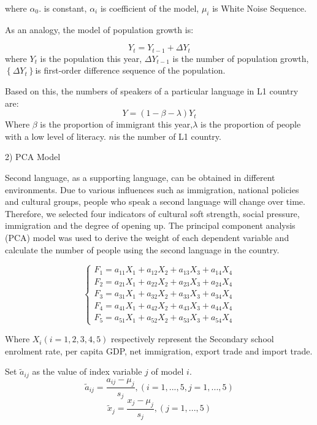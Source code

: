 where ${{\alpha }_{0}}$. is constant, ${{\alpha }_{i}}$ is coefficient of the model, ${{\mu }_{i}}$ is White Noise Sequence.

As an analogy, the model of population growth is:

\begin{equation}\label{renkouzengzhang}
  {Y_t} = {Y_{t - 1}} + \Delta {Y_t}
\end{equation}
where ${{Y}_{t}}$ is the population this year, $\Delta {{Y}_{t-1}}$ is the number of population growth, $\left\{ \Delta {{Y}_{t}} \right\}$is first-order difference sequence of the population.

Based on this, the numbers of speakers of a particular language in L1 country are:
\[Y = (1 - \beta  - \lambda ){Y_t}\]
Where $\beta $ is the proportion of immigrant this year,$\lambda $ is the proportion of people with a low level of literacy. $n$is the number of L1 country.

2) PCA Model

    Second language, as a supporting language, can be obtained in different environments. Due to various influences such as immigration, national policies and cultural groups, people who speak a second language will change over time. Therefore, we selected four indicators of cultural soft strength, social pressure, immigration and the degree of opening up. The principal component analysis (PCA) model was used to derive the weight of each dependent variable and calculate the number of people using the second language in the country.

    \[\left\{ \begin{array}{l}
{F_1} = {a_{11}}{X_1} + {a_{12}}{X_2} + {a_{13}}{X_3} + {a_{14}}{X_4}\\
{F_2} = {a_{21}}{X_1} + {a_{22}}{X_2} + {a_{23}}{X_3} + {a_{24}}{X_4}\\
{F_3} = {a_{31}}{X_1} + {a_{32}}{X_2} + {a_{33}}{X_3} + {a_{34}}{X_4}\\
{F_4} = {a_{41}}{X_1} + {a_{42}}{X_2} + {a_{43}}{X_3} + {a_{44}}{X_4}\\
{F_5} = {a_{51}}{X_1} + {a_{52}}{X_2} + {a_{53}}{X_3} + {a_{54}}{X_4}
\end{array} \right.\]

Where  ${X_i}\left( {i = 1,2,3,4,5} \right)$ respectively represent the Secondary school enrolment rate, per capita GDP, net immigration, export trade and import trade.

Set ${{\widetilde{a}}_{ij}}$ as the value of index variable $j$ of model $i$.
\[{\widetilde a_{ij}} = \frac{{{a_{ij}} - {\mu _j}}}{{{s_j}}},(i = 1,...,5,j = 1,...,5)\]
\[{\widetilde x_j} = \frac{{{x_j} - {\mu _j}}}{{{s_j}}},(j = 1,...,5)\]

